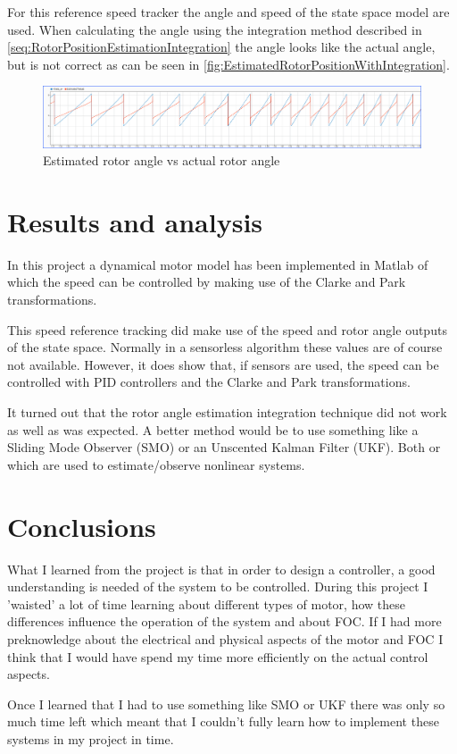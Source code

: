 \documentclass[]{report}
\begin{document}
For this reference speed tracker the angle and speed of the state space model are used. When calculating the angle using the integration method described in \autoref{seq:RotorPositionEstimationIntegration} the angle looks like the actual angle, but is not correct as can be seen in \autoref{fig:EstimatedRotorPositionWithIntegration}.

\begin{figure}[H]
	\centering
	\includegraphics[width=\textwidth]{Matlab/Estimated_ThetaE_FluxIntegration.png}
	\caption{Estimated rotor angle vs actual rotor angle}
	\label{fig:EstimatedRotorPositionWithIntegration}
\end{figure}
	
\chapter{Results and analysis}

In this project a dynamical motor model has been implemented in Matlab of which the speed can be controlled by making use of the Clarke and Park transformations.

This speed reference tracking did make use of the speed and rotor angle outputs of the state space. Normally in a sensorless algorithm these values are of course not available. However, it does show that, if sensors are used, the speed can be controlled with PID controllers and the Clarke and Park transformations.

It turned out that the rotor angle estimation integration technique did not work as well as was expected. A better method would be to use something like a Sliding Mode Observer (SMO) or an Unscented Kalman Filter (UKF). Both or which are used to estimate/observe nonlinear systems.

\chapter{Conclusions}

What I learned from the project is that in order to design a controller, a good understanding is needed of the system to be controlled. During this project I 'waisted' a lot of time learning about different types of motor, how these differences influence the operation of the system and about FOC. If I had more preknowledge about the electrical and physical aspects of the motor and FOC I think that I would have spend my time more efficiently on the actual control aspects.

Once I learned that I had to use something like SMO or UKF there was only so much time left which meant that I couldn't fully learn how to implement these systems in my project in time.

\printbibliography
\end{document}
